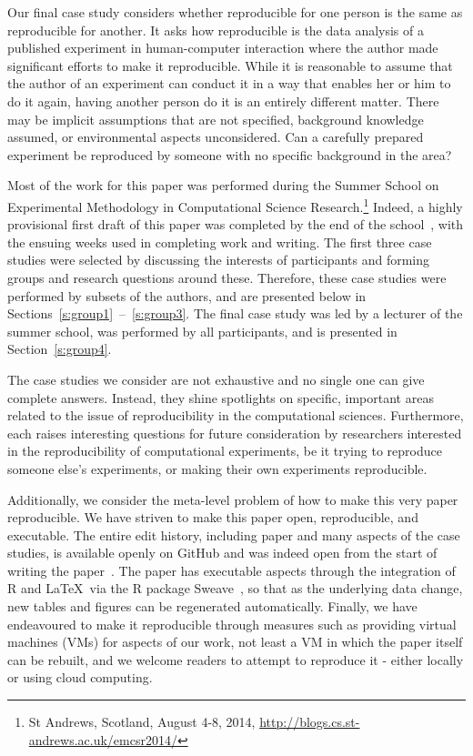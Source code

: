 Our final case study considers whether reproducible for one person is the same
as reproducible for another. It asks how reproducible is the data analysis of a
published experiment in human-computer interaction where the author made
significant efforts to make it reproducible. While it is reasonable to assume
that the author of an experiment can conduct it in a way that enables her or him
to do it again, having another person do it is an entirely different matter.
There may be implicit assumptions that are not specified, background knowledge
assumed, or environmental aspects unconsidered. Can a carefully prepared
experiment be reproduced by someone with no specific background in the area?

Most of the work for this paper was performed during the Summer School on
Experimental Methodology in Computational Science Research.\footnote{St
Andrews, Scotland, August 4-8, 2014,
\url{http://blogs.cs.st-andrews.ac.uk/emcsr2014/}}
Indeed, a highly
provisional first draft of this paper was completed by the end of the
school~\cite{emcsr_arxiv_draft}, with the ensuing weeks used in completing work and writing.  
The first three case studies
were selected by discussing the interests of participants and forming groups
and research questions around these. Therefore, these case studies were
performed by subsets of the authors, and are
presented below in Sections~\ref{s:group1}~--~\ref{s:group3}. The final case
study was led by a lecturer of the summer school, was performed by all
participants, and is presented in Section~\ref{s:group4}.

The case studies we consider are not exhaustive and no single one can give
complete answers. Instead, they shine spotlights on specific, important areas
related to the issue of reproducibility in the computational sciences. Furthermore,
each raises interesting questions for future consideration by researchers
interested in the reproducibility of computational experiments, be it trying to
reproduce someone else's experiments, or making their own experiments
reproducible.

Additionally, we consider the meta-level problem of how to make this very paper
reproducible. We have striven to make this paper open, reproducible, and
executable.
The entire edit history, including paper and many aspects of the
case studies, is available openly on
GitHub
and was indeed open from the start
of writing the paper~\cite{summerschoolpaper}.
The paper has executable aspects through the integration of R
and \LaTeX\ via the R package Sweave~\cite{lmucs-papers:Leisch:2002}, so that as the underlying
data change, new tables and figures can be regenerated automatically. Finally,
we have endeavoured to make it reproducible through measures such as providing
virtual machines (VMs) for aspects of our work, not least a VM in which
the paper itself can be rebuilt, and we welcome readers to attempt to
reproduce it - either locally or using cloud computing.

